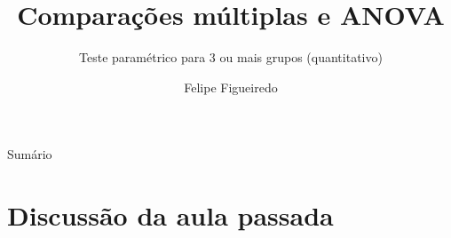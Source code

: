 \documentclass{beamer}
\title%
{Comparações múltiplas e ANOVA}
\subtitle
{Teste paramétrico para 3 ou mais grupos (quantitativo)} %
\author%
{Felipe Figueiredo}%
\institute[INTO] %
{Instituto Nacional de Traumatologia e Ortopedia
}
\date%
{}
\begin{document}
\begin{frame}
  \titlepage
\end{frame}

\begin{frame}{Sumário}
  \tableofcontents
\end{frame}








\section{Discussão da aula passada}
\end{document}
